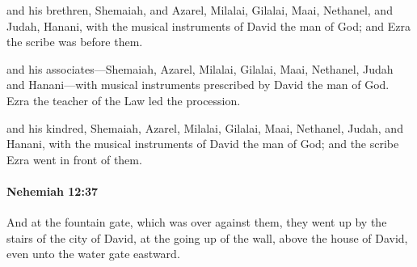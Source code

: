 			\begin{versebox}
					\item[BHS] 
					\item[LXX] 
					\item[ASV] and his brethren, Shemaiah, and Azarel, Milalai, Gilalai, Maai, Nethanel, and Judah, Hanani, with the musical instruments of David the man of God; and Ezra the scribe was before them.
					\item[NIV] and his associates—Shemaiah, Azarel, Milalai, Gilalai, Maai, Nethanel, Judah and Hanani—with musical instruments prescribed by David the man of God. Ezra the teacher of the Law led the procession.
					\item[NRSV] and his kindred, Shemaiah, Azarel, Milalai, Gilalai, Maai, Nethanel, Judah, and Hanani, with the musical instruments of David the man of God; and the scribe Ezra went in front of them.
			\end{versebox}

		\paragraph{Nehemiah 12:37} %
			\label{NEHEMIAH-12-37}

			And at the fountain gate, which was over against them, they went up by the stairs of the city of David, at the going up of the wall, above the house of David, even unto the water gate eastward.

